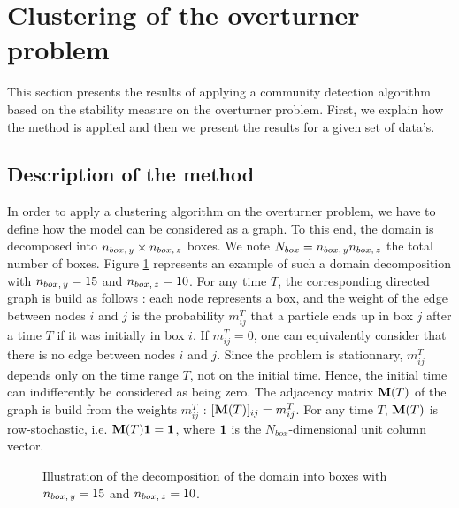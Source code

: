 \section{Clustering of the overturner problem}

This section presents the results of applying a community detection algorithm based on the stability measure on the overturner problem. First, we explain how the method is applied and then we present the results for a given set of data's.

\subsection{Description of the method}
In order to apply a clustering algorithm on the overturner problem, we have to define how the model can be considered as a graph. To this end, the domain is decomposed into $n_{box,\,y} \times n_{box,\,z}$ boxes. We note $N_{box} = n_{box,\,y}n_{box,\,z}$ the total number of boxes. Figure \ref{fig:box_scheme} represents an example of such a domain decomposition with $n_{box,\,y} = 15$ and $n_{box,\,z} = 10$. For any time $T$, the corresponding directed graph is build as follows : each node represents a box, and the weight of the edge between nodes $i$ and $j$ is the probability $m^T_{ij}$ that a particle ends up in box $j$ after a time $T$ if it was initially in box $i$. If $m^T_{ij} = 0$, one can equivalently consider that there is no edge between nodes $i$ and $j$. Since the problem is stationnary, $m^T_{ij}$ depends only on the time range $T$, not on the initial time. Hence, the initial time can indifferently be considered as being zero. The adjacency matrix $\mathbf M(T)$ of the graph is build from the weights $m^T_{ij}$ : $[\mathbf M(T)]_{ij} = m^T_{ij}$. For any time $T$, $\mathbf M(T)$ is row-stochastic, i.e. $\mathbf M(T)\mathbf 1 = \mathbf 1$, where $\mathbf 1$ is the $N_{box}$-dimensional unit column vector.
\begin{figure}[h!]
	\centering
	
	\caption{Illustration of the decomposition of the domain into boxes with $n_{box,\,y} = 15$ and $n_{box,\,z} = 10$.}
	\label{fig:box_scheme}
\end{figure}

